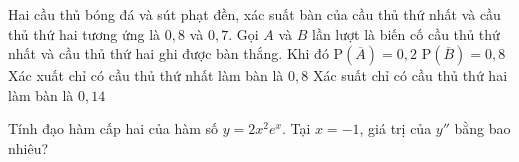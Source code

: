 \begin{ex}%

	Hai cầu thủ bóng đá và sút phạt đền, xác suất bàn của cầu thủ thứ nhất và cầu thủ thứ hai tương ứng là $0{,}8$ và $0{,}7$. Gọi $A$ và $B$ lần lượt là biến cố cầu thủ thứ nhất và cầu thủ thứ hai ghi được bàn thắng. Khi đó
	\choiceTF
	{\True $\mathrm{P}\left(\overline{A}\right)=0{,}2$}
	{$\mathrm{P}\left(\overline{B}\right)=0{,}8$}
	{Xác xuất chỉ có cầu thủ thứ nhất làm bàn là $0{,}8$}
	{\True Xác suất chỉ có cầu thủ thứ hai làm bàn là $0{,}14$}
\end{ex}

\begin{bt}%

	Tính đạo hàm cấp hai của hàm số $y = 2 x^{2} e^{x}$. Tại $x = -1$, giá trị của $y''$ bằng bao nhiêu?
\end{bt}

